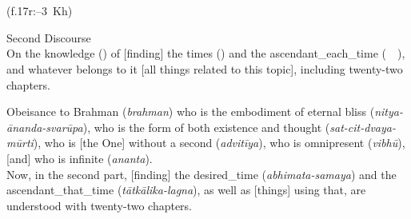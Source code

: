 \begin{multicols}{2}
\noindent\reversemarginpar{}
\\
\columnbreak

\noindent\normalmarginpar{}%
\\[5pt]
%
\enskip (f.\thinspace 17r:--3~Kh)
\end{multicols}%
%
\begin{multicols}{2}
Second Discourse\\
On the \gls{knowledge} (\marifat) of [finding] the \glspl{time} (\avqat) and the \gls{ascendant_each_time} (\tali\ \har\ \vaqt), and whatever belongs to it [\ie all things related to this topic], including twenty-two chapters.
\columnbreak

Obeisance to Brahman (\textit{brahman}) who is the embodiment of eternal bliss (\textit{nitya-ānanda-svarūpa}), who is the form of both existence and thought (\textit{sat-cit-dvaya-mūrti}), who is [the One] without a second (\textit{advitīya}), who is omnipresent (\textit{vibhū}), [and] who is infinite (\textit{ananta}).\\[5pt] 
Now, in the second part, [finding] the \gls{desired_time} (\textit{abhimata-samaya}) and the \gls{ascendant_that_time} (\textit{tātkālika-lagna}), as well as [things] using that, are understood with twenty-two chapters. 
\end{multicols}

\newpage %

